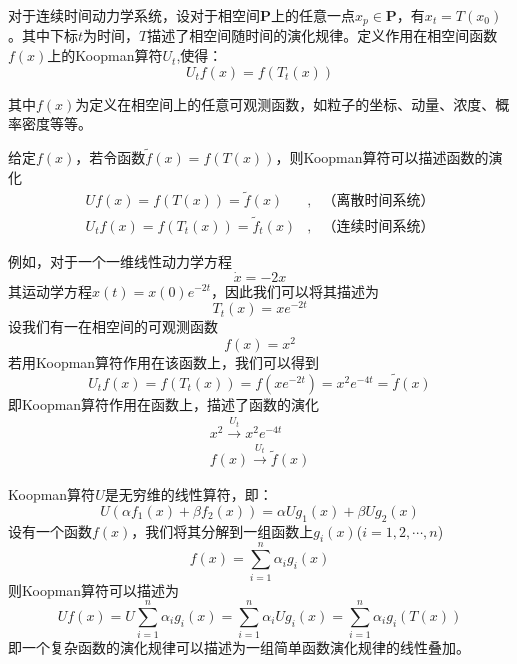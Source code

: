 对于连续时间动力学系统，设对于相空间$\mathbf{P}$上的任意一点$x_p\in \mathbf{P}$，有$x_t=T(x_0)$。其中下标$t$为时间，$T$描述了相空间随时间的演化规律。定义作用在相空间函数$f(x)$上的Koopman算符$U_t$,使得：
\begin{equation}
    U_tf(x)=f(T_t(x))
\end{equation} 

其中$f(x)$为定义在相空间上的任意可观测函数，如粒子的坐标、动量、浓度、概率密度等等。

给定$f(x)$，若令函数$\tilde{f}(x)=f(T(x))$，则Koopman算符可以描述函数的演化
\begin{equation}
    \begin{aligned}
        Uf(x)=f(T(x))=\tilde{f}(x)       &,&\text{（离散时间系统）}\\
        U_tf(x)=f(T_t(x))=\tilde{f}_t(x) &,&\text{（连续时间系统）}
    \end{aligned}
\end{equation}

例如，对于一个一维线性动力学方程
\begin{equation}
    \dot{x}=-2x
\end{equation}
其运动学方程$x(t)=x(0)e^{-2t}$，因此我们可以将其描述为
\begin{equation}
    T_t(x)=xe^{-2t}
\end{equation}
设我们有一在相空间的可观测函数
\begin{equation}
    f(x)=x^2
\end{equation}
若用Koopman算符作用在该函数上，我们可以得到
\begin{equation}
    U_tf(x)=f(T_t(x))=f(xe^{-2t})=x^2e^{-4t}=\tilde{f}(x)
\end{equation}
即Koopman算符作用在函数上，描述了函数的演化
\begin{equation}
    \begin{aligned}
        x^2 \stackrel{U_t}{\longrightarrow} x^2e^{-4t} \\
        f(x) \stackrel{U_t}{\longrightarrow} \tilde{f}(x)
    \end{aligned}
\end{equation}

Koopman算符$U$是无穷维的线性算符，即：
\begin{equation}
    U(\alpha f_1(x)+\beta f_2(x))=\alpha Ug_1(x)+\beta Ug_2(x)
\end{equation}
设有一个函数$f(x)$，我们将其分解到一组函数上$g_i(x)$($i=1,2,\cdots,n$)
\begin{equation}
    f(x)=\sum_{i=1}^n\alpha_ig_i(x)
\end{equation}
则Koopman算符可以描述为
\begin{equation}
    Uf(x)=U\sum_{i=1}^n\alpha_ig_i(x)=\sum_{i=1}^n\alpha_iUg_i(x)=\sum_{i=1}^n\alpha_ig_i(T(x))
\end{equation}
即一个复杂函数的演化规律可以描述为一组简单函数演化规律的线性叠加。

